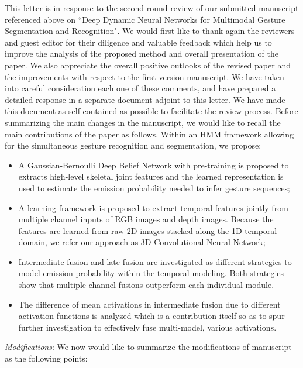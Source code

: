 \documentclass[12pt]{article}
\begin{document}
This letter is in response to the second round review of our submitted manuscript referenced above on ``Deep Dynamic Neural Networks for Multimodal Gesture Segmentation and Recognition".
%
We would first like to thank again the reviewers and guest editor for their diligence and valuable feedback which help us to improve the analysis of the proposed method and overall presentation of the paper.
%
We also appreciate the overall positive outlooks of the revised paper and the improvements with respect to the first version manuscript.
%
We have taken into careful consideration each one of these comments, and have prepared a detailed response
in a separate document adjoint to this letter.
%
We have made this document as self-contained as possible to facilitate the review process.
%
Before summarizing the main changes in the manuscript, we would like to recall the main contributions of the paper as follows.
Within an HMM framework allowing for the simultaneous gesture recognition and segmentation, we propose:
\begin{itemize}
\item A Gaussian-Bernoulli Deep Belief Network with pre-training is proposed to extracts high-level skeletal joint features and the learned representation is used to estimate the emission probability needed to infer gesture sequences;
\item A learning framework is proposed to extract temporal features jointly from multiple channel inputs of RGB images and depth images. Because the features are learned from raw 2D images stacked along the 1D temporal domain, we refer our approach as 3D Convolutional Neural Network;
\item Intermediate fusion and late fusion are investigated as different strategies to model emission probability within the temporal modeling. Both strategies show that multiple-channel fusions outperform each individual module.
\item The difference of mean activations in intermediate fusion due to different activation functions is analyzed which is a contribution itself so as to spur further investigation to effectively fuse multi-model, various activations.
\end{itemize}


{\noindent \em Modifications}: We now would like to summarize the modifications of manuscript as the following points:
\end{document}
